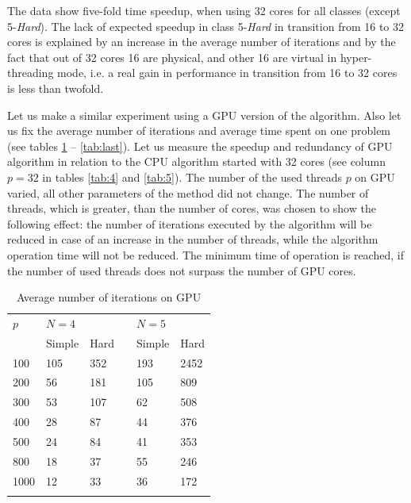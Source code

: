 \documentclass[smallcondensed]{svjour3}     %
\begin{document}
The data show five-fold time speedup, when using 32 cores for all classes (except 5-\textit{Hard}). The lack of expected speedup in class 5-\textit{Hard} in transition from 16 to 32 cores is explained by an increase in the average number of iterations and by the fact that out of 32 cores 16 are physical, and other 16 are virtual in hyper-threading mode, i.e. a real gain in performance in transition from 16 to 32 cores is less than twofold.

Let us make a similar experiment using a GPU version of the algorithm. Also let us fix the average number of iterations and average time spent on one problem (see tables \ref{tab:last4} -- \ref{tab:last}). Let us measure the speedup and redundancy of GPU algorithm in relation to the CPU algorithm started with 32 cores (see column $p=32$ in tables \ref{tab:4} and \ref{tab:5}). The number of the used threads $p$ on GPU varied, all other parameters of the method did not change. The number of threads, which is greater, than the number of cores, was chosen to show the following effect: the number of iterations executed by the algorithm will be reduced in case of an increase in the number of threads, while the algorithm operation time will not be reduced. The minimum time of operation is reached, if the number of used threads does not surpass the number of GPU cores.


\begin{table}
	\caption{Average number of iterations on GPU}
	\label{tab:last4}
	\center
	\begin{tabular}{llllll}
		\hline\noalign{\smallskip}
		$p$ & \multicolumn{2}{l}{ $N=4$ } & & \multicolumn{2}{l}{$N=5$} \\
		\noalign{\smallskip} \cline{2-3} \cline{5-6} \noalign{\smallskip}
		 & Simple & Hard & & Simple & Hard  \\
		\noalign{\smallskip} \hline \noalign{\smallskip}		
100 &	105 &	352 & &	193  &	2452 \\
200 &	56 &	181 & &	105  &	809 \\
300 &	53 &	107 & & 62  &	508 \\
400 &	28 &	87 & &	44  &	376 \\
500 &	24 &	84 & &	41  &	353 \\
800 &	18 &	37 & &	55 &	246 \\
1000 &	12 &	33 & &	36 &	172 \\
		\noalign{\smallskip}\hline
	\end{tabular}
\end{table}
\end{document}
